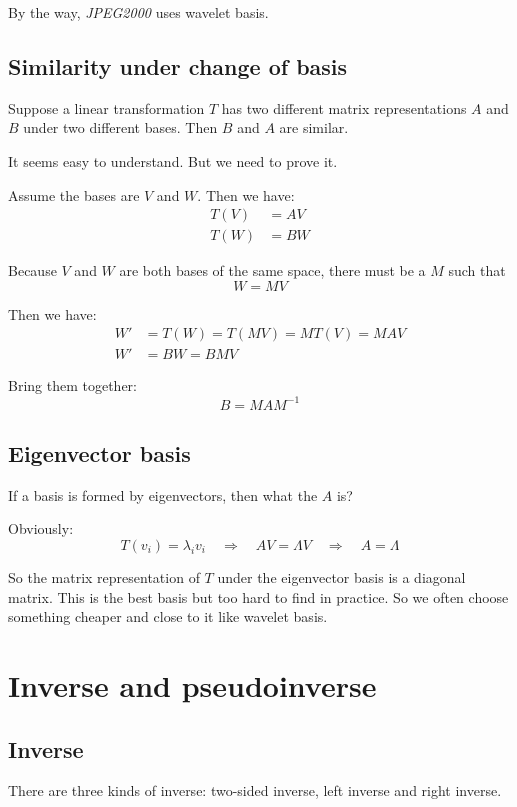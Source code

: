 \documentclass[10pt,a4paper,oneside,numbers=noenddot]{scrbook}
\theoremstyle{ctplain}
\theoremstyle{ctresult}
\begin{document}
By the way, \emph{JPEG2000} uses wavelet basis.

\subsection{Similarity under change of basis}

Suppose a linear transformation $T$ has two different matrix representations $A$ and $B$
under two different bases. Then $B$ and $A$ are similar.

It seems easy to understand. But we need to prove it.

Assume the bases are $V$ and $W$. Then we have:
\begin{align*}
  T(V) &= AV \\
  T(W) &= BW
\end{align*}

Because $V$ and $W$ are both bases of the same space, there must be a $M$ such that
\[
  W = MV
\]

Then we have:
\begin{align*}
  W' &= T(W) = T(MV) = M T(V) = MAV \\
  W' &= BW = BMV
\end{align*}

Bring them together:
\[
  B = MAM^{-1}
\]

\subsection{Eigenvector basis}

If a basis is formed by eigenvectors, then what the $A$ is?

Obviously:
\[
  T(v_i) = \lambda_i v_i \quad \Rightarrow \quad
  AV = \Lambda V \quad \Rightarrow \quad
  A = \Lambda
\]

So the matrix representation of $T$ under the eigenvector basis is a diagonal matrix.
This is the best basis but too hard to find in practice. So we often choose something cheaper
and close to it like wavelet basis.

\section{Inverse and pseudoinverse}
\subsection{Inverse}
There are three kinds of inverse: two-sided inverse, left inverse and right inverse.
\end{document}
